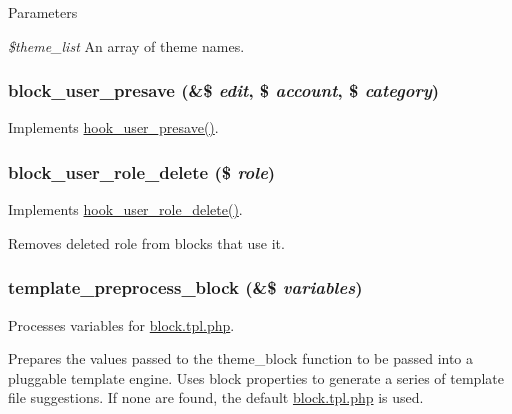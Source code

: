 \begin{DoxyParams}{Parameters}
\item[{\em \$theme\_\-list}]An array of theme names. \end{DoxyParams}
\hypertarget{block_8module_a22658a5cc41804828703ddbad204bb24}{
\subsubsection[{block\_\-user\_\-presave}]{\setlength{\rightskip}{0pt plus 5cm}block\_\-user\_\-presave (\&\$ {\em edit}, \/  \$ {\em account}, \/  \$ {\em category})}}
\label{block_8module_a22658a5cc41804828703ddbad204bb24}
Implements \hyperlink{group__hooks_gab6b224c35d7d97259d4350a7849f1e56}{hook\_\-user\_\-presave()}. \hypertarget{block_8module_a91a7dcf5c56bd33c0be56227eae1d02e}{
\subsubsection[{block\_\-user\_\-role\_\-delete}]{\setlength{\rightskip}{0pt plus 5cm}block\_\-user\_\-role\_\-delete (\$ {\em role})}}
\label{block_8module_a91a7dcf5c56bd33c0be56227eae1d02e}
Implements \hyperlink{group__hooks_gaf2a69f678861a227e36de13b87c340a7}{hook\_\-user\_\-role\_\-delete()}.

Removes deleted role from blocks that use it. \hypertarget{block_8module_af4bcb538ddb98ffdd9ec8037631f10fa}{
\subsubsection[{template\_\-preprocess\_\-block}]{\setlength{\rightskip}{0pt plus 5cm}template\_\-preprocess\_\-block (\&\$ {\em variables})}}
\label{block_8module_af4bcb538ddb98ffdd9ec8037631f10fa}
Processes variables for \hyperlink{block_8tpl_8php}{block.tpl.php}.

Prepares the values passed to the theme\_\-block function to be passed into a pluggable template engine. Uses block properties to generate a series of template file suggestions. If none are found, the default \hyperlink{block_8tpl_8php}{block.tpl.php} is used.

